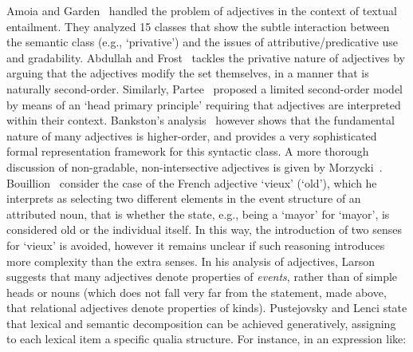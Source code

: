 \documentclass[11pt]{article}
\begin{document}
Amoia and Garden~ handled the problem of adjectives in the context of textual entailment. They analyzed 15 classes that show the subtle interaction between the semantic class (e.g., `privative') and the issues of attributive/predicative use and gradability.  
Abdullah and Frost~ tackles the privative nature of adjectives by arguing that the adjectives modify the set themselves, in a manner that is naturally second-order. Similarly, Partee~ proposed a limited second-order model by means of an `head primary principle' requiring that adjectives are interpreted within their context. %
Bankston's analysis~ however shows that the fundamental nature of many adjectives is higher-order, and provides a very sophisticated formal representation framework for this syntactic class.
A more thorough discussion of non-gradable, non-intersective adjectives is given by Morzycki~.
Bouillion~ consider the case of the French adjective `vieux' (`old'), which he interprets as selecting two different
elements in the event structure of an attributed noun, that is whether the
state, e.g., being a `mayor' for `mayor', is considered old or the individual
itself. In this way, the introduction of two senses for `vieux' is avoided, 
however it remains unclear if such reasoning introduces more complexity than
the extra senses. %
In his analysis of adjectives, Larson  suggests that many adjectives denote properties of \textit{events}, rather than of simple heads or nouns (which does not fall very far from the statement, made above, that relational adjectives denote properties of kinds). Pustejovsky  and Lenci  state that lexical and semantic decomposition can be achieved generatively, assigning to each lexical item a specific qualia structure. For instance, in an expression like:
\end{document}
